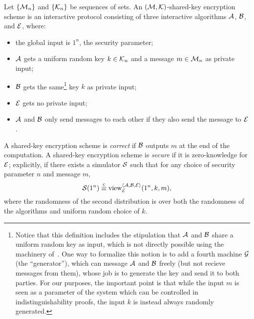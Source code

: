 

\begin{dfn}
Let $\{\mathcal{M}_n\}$ and $\{\mathcal{K}_n\}$ be sequences of sets. An $(\mathcal{M}, \mathcal{K})$-shared-key
encryption scheme is an interactive protocol consisting of three interactive
algorithms $\mathcal{A}$, $\mathcal{B}$, and $\mathcal{E}$, where:
\begin{itemize}
  \item the global input is $1^n$, the security parameter;
  \item $\mathcal{A}$ gets a uniform random key $k\in\mathcal{K}_n$ and a message $m\in\mathcal{M}_n$ as private input;
  \item $\mathcal{B}$ gets the same\footnote{
    Notice that this definition includes the stipulation that $\mathcal{A}$ and $\mathcal{B}$ share a
    uniform random key as input, which is not directly possible using the machinery
    of~.
    One way to formalize this notion is to add a fourth machine $\mathcal{G}$ (the
    ``generator''), which can message $\mathcal{A}$ and $\mathcal{B}$ freely (but not recieve
    messages from them), whose job is to generate the key and send it to both
    parties. For our purposes, the important point is that while the input $m$
    is seen as a parameter of the system which can be controlled in
    indistinguishability proofs, the input $k$ is instead always randomly
    generated.
    } key $k$ as private input;
  \item $\mathcal{E}$ gets no private input;
  \item $\mathcal{A}$ and $\mathcal{B}$ only send messages to each other if they also send the
    message to $\mathcal{E}$.
\end{itemize}

A shared-key encryption scheme is \emph{correct} if $\mathcal{B}$ outputs $m$ at the
end of the computation. A shared-key encryption scheme is \emph{secure} if it
is zero-knowledge for $\mathcal{E}$; explicitly, if there exists a simulator $\mathcal{S}$
such that for any choice of security parameter $n$ and message $m$, \[
  \mathcal{S}(1^n) \overset{\text{c}}{\equiv} \operatorname{view}_{\mathcal{E}}^{\langle\mathcal{A}, \mathcal{B}, \mathcal{E}\rangle}(1^n, k, m),
\]where the randomness of the second distribution is over both the randomness of
the algorithms and uniform random choice of $k$.
\end{dfn}

